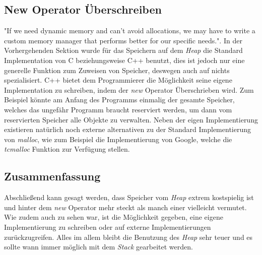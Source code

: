 \subsection{New Operator Überschreiben}
"If we need dynamic memory and can't avoid allocations, we may have to write a custom memory
manager that performs better for our specific needs."\cite{C++HighPer2}. In der Vorhergehenden
Sektion wurde für das Speichern auf dem \emph{Heap} die Standard Implementation von C
beziehungsweise C++ benutzt, dies ist jedoch nur eine generelle Funktion zum Zuweisen von
Speicher, deswegen auch auf nichts spezialisiert. C++ bietet dem Programmierer die Möglichkeit
seine eigene Implementation zu schreiben, indem der \emph{new} Operator Überschrieben wird. Zum
Beispiel könnte am Anfang des Programms einmalig der gesamte Speicher, welches das ungefähr
Programm braucht reserviert werden, um dann vom reservierten Speicher alle Objekte zu verwalten.
\newline
\newline
Neben der eigen Implementierung existieren natürlich noch externe alternativen zu der Standard
Implementierung von \emph{malloc}, wie zum Beispiel die Implementierung von Google, welche die
\emph{tcmalloc} Funktion zur Verfügung stellen.

\subsection{Zusammenfassung}
Abschließend kann gesagt werden, dass Speicher vom \emph{Heap} extrem kostspielig ist und hinter
dem \emph{new} Operator mehr steckt als manch einer vielleicht vermutet. Wie zudem auch zu sehen
war, ist die Möglichkeit gegeben, eine eigene Implementierung zu schreiben oder auf externe
Implementierungen zurückzugreifen. Alles im allem bleibt die Benutzung des \emph{Heap} sehr teuer
und es sollte wann immer möglich mit dem \emph{Stack} gearbeitet werden.